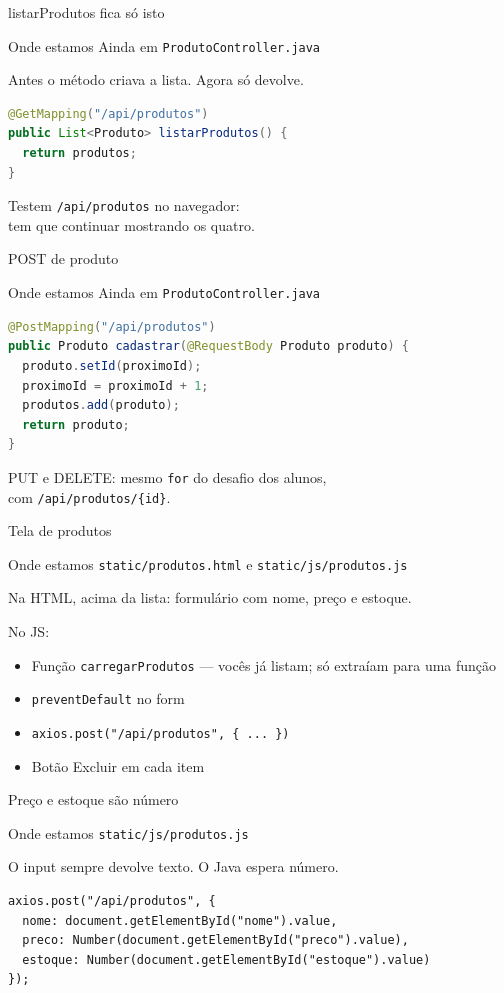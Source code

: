 \documentclass[aspectratio=169,11pt]{beamer}
\newcommand{\onde}[1]{%
  \begin{block}{Onde estamos}
    #1
  \end{block}
}
\begin{document}
\begin{frame}[fragile]{listarProdutos fica só isto}
  \onde{Ainda em \texttt{ProdutoController.java}}

  Antes o método criava a lista. Agora só devolve.

\begin{lstlisting}[language=Java,basicstyle=\ttfamily\footnotesize]
@GetMapping("/api/produtos")
public List<Produto> listarProdutos() {
  return produtos;
}
\end{lstlisting}

  Testem \texttt{/api/produtos} no navegador:\\
  tem que continuar mostrando os quatro.
\end{frame}

\begin{frame}[fragile]{POST de produto}
  \onde{Ainda em \texttt{ProdutoController.java}}

\begin{lstlisting}[language=Java,basicstyle=\ttfamily\footnotesize]
@PostMapping("/api/produtos")
public Produto cadastrar(@RequestBody Produto produto) {
  produto.setId(proximoId);
  proximoId = proximoId + 1;
  produtos.add(produto);
  return produto;
}
\end{lstlisting}

  PUT e DELETE: mesmo \texttt{for} do desafio dos alunos,\\
  com \texttt{/api/produtos/\{id\}}.
\end{frame}

\begin{frame}{Tela de produtos}
  \onde{\texttt{static/produtos.html} e \texttt{static/js/produtos.js}}

  Na HTML, acima da lista: formulário com nome, preço e estoque.

  \vspace{0.4em}
  No JS:
  \begin{itemize}
    \item Função \texttt{carregarProdutos} --- vocês já listam;
          só extraíam para uma função
    \item \texttt{preventDefault} no form
    \item \texttt{axios.post("/api/produtos", \{ ... \})}
    \item Botão Excluir em cada item
  \end{itemize}
\end{frame}

\begin{frame}[fragile]{Preço e estoque são número}
  \onde{\texttt{static/js/produtos.js}}

  O input sempre devolve texto. O Java espera número.

\begin{lstlisting}[basicstyle=\ttfamily\footnotesize]
axios.post("/api/produtos", {
  nome: document.getElementById("nome").value,
  preco: Number(document.getElementById("preco").value),
  estoque: Number(document.getElementById("estoque").value)
});
\end{lstlisting}
\end{frame}
\end{document}
